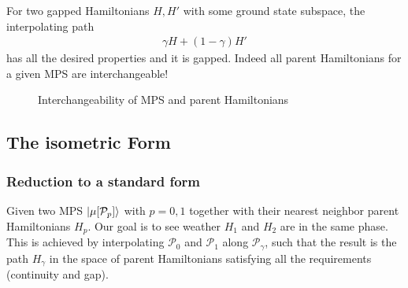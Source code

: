 For two gapped Hamiltonians $H, H'$ with some ground state subspace, the
interpolating path
\begin{align}
    \gamma H + (1-\gamma)H'
\end{align}
has all the desired properties and it is gapped. Indeed all parent
Hamiltonians for a given MPS are interchangeable!

\begin{figure}[H]
    \centering
{}
\caption{Interchangeability of MPS and parent Hamiltonians}
\end{figure}
\subsection{The isometric Form}
\subsubsection{Reduction to a standard form}
Given two MPS $\ket{\mu [\mathcal{P}_p]}$ with $p=0,1$ together with their
nearest neighbor parent Hamiltonians $H_p$. Our goal is to see weather $H_1$
and $H_2$ are in the same phase. This is achieved by interpolating
$\mathcal{P}_0$ and $\mathcal{P}_1$ along $\mathcal{P}_\gamma$, such that the
result is the path $H_\gamma$ in the space of parent Hamiltonians satisfying
all the requirements (continuity and gap).
